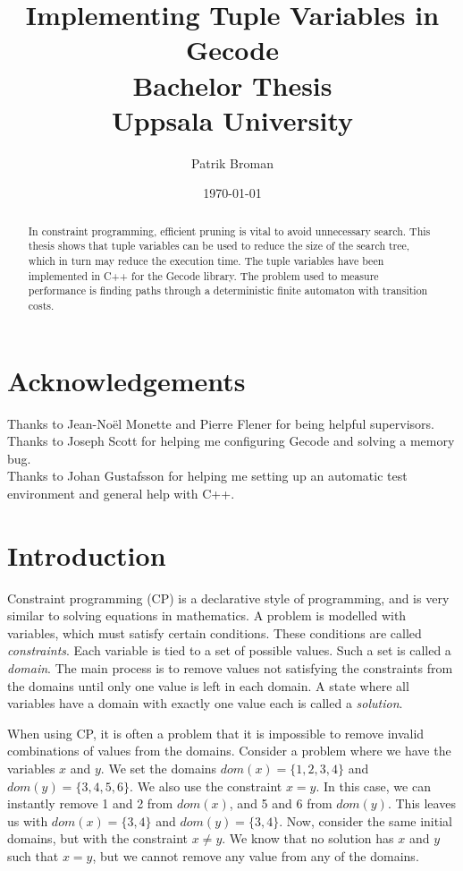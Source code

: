 \documentclass[a4paper,11pt]{article}
\title{\textbf{Implementing Tuple Variables in Gecode\\
	Bachelor Thesis \\
    Uppsala University  \\
  }
}
\author{Patrik Broman}
\date{\today}
\begin{document}
\maketitle
{}

\newpage

\begin{abstract}

In constraint programming, efficient pruning is vital to avoid unnecessary search. This thesis shows that tuple variables can be used to reduce the size of the search tree, which in turn may reduce the execution time. The tuple variables have been implemented in C++ for the Gecode library. The problem used to measure performance is finding paths through a deterministic finite automaton with transition costs.

\end{abstract}
\newpage
\setcounter{tocdepth}{2}
\tableofcontents
\pagestyle{plain}
\newpage

\section*{Acknowledgements}
Thanks to Jean-No\"{e}l Monette and Pierre Flener for being helpful supervisors. \\
Thanks to Joseph Scott for helping me configuring Gecode and solving a memory bug. \\
Thanks to Johan Gustafsson for helping me setting up an automatic test environment and general help with C++. \\

\newpage

\section{Introduction}
Constraint programming (CP) is a declarative style of programming, and is very similar to solving equations in mathematics. A problem is modelled with variables, which must satisfy certain conditions. These conditions are called \textit{constraints}. Each variable is tied to a set of possible values. Such a set is called a \textit{domain}. The main process is to remove values not satisfying the constraints from the domains until only one value is left in each domain. A state where all variables have a domain with exactly one value each is called a \textit{solution}.

When using CP, it is often a problem that it is impossible to remove invalid combinations of values from the domains. Consider a problem where we have the variables $x$ and $y$. We set the domains $\mathit{dom}(x)=\{1,2,3,4\}$ and $\mathit{dom}(y)=\{3,4,5,6\}$. We also use the constraint $x=y$. In this case, we can instantly remove 1 and 2 from $\mathit{dom}(x)$, and 5 and 6 from $\mathit{dom}(y)$. This leaves us with $\mathit{dom}(x)=\{3,4\}$ and $\mathit{dom}(y)=\{3,4\}$. Now, consider the same initial domains, but with the constraint $x\neq y$. We know that no solution has $x$ and $y$ such that $x=y$, but we cannot remove any value from any of the domains. 
\end{document}
